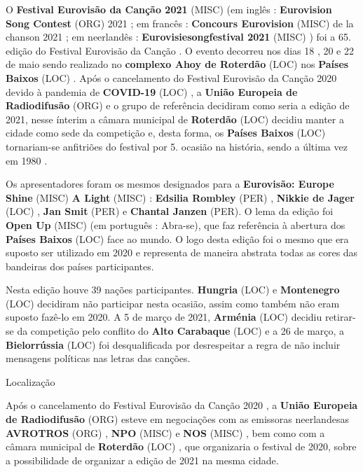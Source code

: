 \documentclass[12pt,a4paper]{article}
\begin{document}
O \textbf{Festival Eurovisão da Canção 2021} (MISC) (em inglês : \textbf{Eurovision Song Contest} (ORG) 2021 ; em francês : \textbf{Concours Eurovision} (MISC) de la chanson 2021 ; em neerlandês : \textbf{Eurovisiesongfestival 2021} (MISC) ) foi a 65. edição do Festival Eurovisão da Canção . O evento decorreu nos dias 18 , 20 e 22 de maio sendo realizado no \textbf{complexo Ahoy de Roterdão} (LOC) nos \textbf{Países Baixos} (LOC) . Após o cancelamento do Festival Eurovisão da Canção 2020 devido à pandemia de \textbf{COVID-19} (LOC) , a \textbf{União Europeia de Radiodifusão} (ORG) e o grupo de referência decidiram como seria a edição de 2021, nesse ínterim a câmara municipal de \textbf{Roterdão} (LOC) decidiu manter a cidade como sede da competição e, desta forma, os \textbf{Países Baixos} (LOC) tornariam-se anfitriões do festival por 5. ocasião na história, sendo a última vez em 1980 .

Os apresentadores foram os mesmos designados para a \textbf{Eurovisão: Europe Shine} (MISC) \textbf{A Light} (MISC) : \textbf{Edsilia Rombley} (PER) , \textbf{Nikkie de Jager} (LOC) , \textbf{Jan Smit} (PER) e \textbf{Chantal Janzen} (PER). O lema da edição foi \textbf{Open Up} (MISC) (em português : Abra-se), que faz referência à abertura dos \textbf{Países Baixos} (LOC) face ao mundo. O logo desta edição foi o mesmo que era suposto ser utilizado em 2020 e representa de maneira abstrata todas as cores das bandeiras dos países participantes.

Nesta edição houve 39 nações participantes. \textbf{Hungria} (LOC) e \textbf{Montenegro} (LOC) decidiram não participar nesta ocasião, assim como também não eram suposto fazê-lo em 2020. A 5 de março de 2021, \textbf{Arménia} (LOC) decidiu retirar-se da competição pelo conflito do \textbf{Alto Carabaque} (LOC) e a 26 de março, a \textbf{Bielorrússia} (LOC) foi desqualificada por desrespeitar a regra de não incluir mensagens políticas nas letras das canções.



Localização

Após o cancelamento do Festival Eurovisão da Canção 2020 , a \textbf{União Europeia de Radiodifusão} (ORG) esteve em negociações com as emissoras neerlandesas \textbf{AVROTROS} (ORG) , \textbf{NPO} (MISC) e \textbf{NOS} (MISC) , bem como com a câmara municipal de \textbf{Roterdão} (LOC) , que organizaria o festival de 2020, sobre a possibilidade de organizar a edição de 2021 na mesma cidade.
\end{document}
